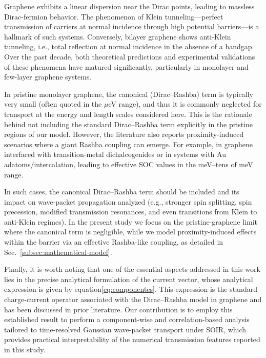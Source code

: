 
Graphene exhibits a linear dispersion near the Dirac points, leading to massless Dirac-fermion behavior.
The phenomenon of Klein tunneling—perfect transmission of carriers at normal incidence through high potential barriers—is a hallmark of such systems.
Conversely, bilayer graphene shows anti-Klein tunneling, i.e., total reflection at normal incidence in the absence of a bandgap.
Over the past decade, both theoretical predictions and experimental validations of these phenomena have matured significantly, particularly in monolayer and few-layer graphene systems.

In pristine monolayer graphene, the canonical (Dirac–Rashba) term is typically very small (often quoted in the $\mu$eV range), and thus it is commonly neglected for transport at the energy and length scales considered here.
This is the rationale behind not including the standard Dirac–Rashba term explicitly in the pristine regions of our model.
However, the literature also reports proximity-induced scenarios where a giant Rashba coupling can emerge.
For example, in graphene interfaced with transition-metal dichalcogenides or in systems with Au adatoms/intercalation, leading to effective SOC values in the meV–tens of meV range\cite{AvsarNatCommun2014, WangPhysRevX2016}.

In such cases, the canonical Dirac–Rashba term should be included and its impact on wave-packet propagation analyzed (e.g., stronger spin splitting, spin precession, modified transmission resonances, and even transitions from Klein to anti-Klein regimes).
In the present study we focus on the pristine-graphene limit where the canonical term is negligible, while we model proximity-induced effects within the barrier via an effective Rashba-like coupling, as detailed in Sec.~\ref{subsec:mathematical-model}.

Finally, it is worth noting that one of the essential aspects addressed in this work lies in the precise analytical formulation of the current vector, whose analytical expression is given by equation\eqref{eq:componentes}.
This expression is the standard charge-current operator associated with the Dirac–Rashba model in graphene and has been discussed in prior literature\cite{AvishaiPhysRevB2021}.
Our contribution is to employ this established result to perform a component-wise and correlation-based analysis tailored to time-resolved Gaussian wave-packet transport under SOIR, which provides practical interpretability of the numerical transmission features reported in this study.


